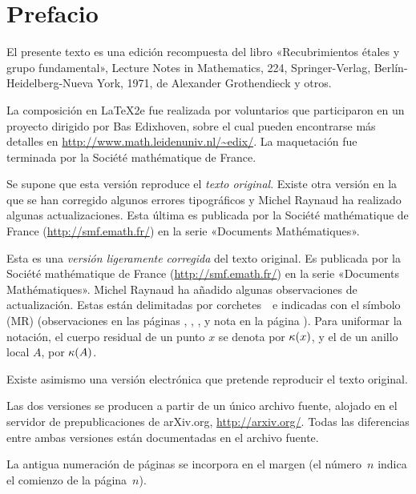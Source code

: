 \renewcommand{\baselinestretch}{1.05}\normalfont
\chapter*{Prefacio}
\thispagestyle{empty}
\vfill

El presente texto es una edición recompuesta
del libro «Recubrimientos étales y grupo fundamental», Lecture Notes in Mathematics, 224, Springer-Verlag, Berlín-Heidelberg-Nueva York, 1971, de Alexander Grothendieck y otros.

La composición en \LaTeX 2e fue realizada por voluntarios que participaron en un proyecto dirigido por Bas Edixhoven, sobre el cual pueden encontrarse más detalles en \url{http://www.math.leidenuniv.nl/~edix/}. La maquetación fue terminada por la Société mathématique de France.

{Se supone que esta versión reproduce el \emph{texto original}. Existe otra versión en la que se han corregido algunos errores tipográficos y Michel Raynaud ha realizado algunas actualizaciones. Esta última es publicada por la Société mathématique de France (\url{http://smf.emath.fr/}) en la serie «Documents Mathématiques».}
{Esta es una \emph{versión ligeramente corregida} del texto original. Es publicada por la Société mathématique de France (\url{http://smf.emath.fr/}) en la serie «Documents Mathématiques». Michel Raynaud ha añadido algunas observaciones de actualización. Estas están delimitadas por corchetes \lcrochetbf\,\rcrochetbf\ e indicadas con el símbolo (MR) (observaciones en las páginas \pageref{X.2.14}, \pageref{XI.1.4}, \pageref{XII.5.6}, \pageref{XIII.2.13} y nota  en la página \pageref{III.6.6.p24}). Para uniformar la notación, el cuerpo residual de un punto $x$ se denota por $\kappa(x)$, y el de un anillo local $A$, por $\kappa(A)$.\par
Existe asimismo una versión electrónica que pretende reproducir el texto original.}

Las dos versiones se producen a partir de un único archivo fuente, alojado en el servidor de prepublicaciones de arXiv.org, \url{http://arxiv.org/}. Todas las diferencias entre ambas versiones están documentadas en el archivo fuente.

La antigua numeración de páginas se incorpora en el margen (el número~$n$ indica el comienzo de la página~$n$).

\vfill
\newpage

